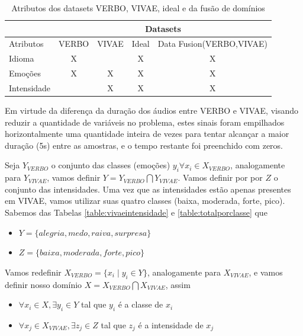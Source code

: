 \begin{table}[]
\centering
\caption{Atributos dos datasets VERBO, VIVAE, ideal e da fusão de domínios}
\begin{tabular}{l|cccc|}
\cline{2-5}
 & \multicolumn{4}{c|}{Datasets} \\ \hline
\multicolumn{1}{|l|}{Atributos} & \multicolumn{1}{c|}{VERBO} & \multicolumn{1}{c|}{VIVAE} & \multicolumn{1}{c|}{Ideal} & Data Fusion(VERBO,VIVAE) \\ \hline
\multicolumn{1}{|l|}{Idioma} & \multicolumn{1}{c|}{X} & \multicolumn{1}{c|}{} & \multicolumn{1}{c|}{X} & X \\ \hline
\multicolumn{1}{|l|}{Emoções} & \multicolumn{1}{c|}{X} & \multicolumn{1}{c|}{X} & \multicolumn{1}{c|}{X} & X \\ \hline
\multicolumn{1}{|l|}{Intensidade} & \multicolumn{1}{c|}{} & \multicolumn{1}{c|}{X} & \multicolumn{1}{c|}{X} & X \\ \hline
\end{tabular}\label{table:datasetideal}
\end{table}

Em virtude da diferença da duração dos áudios entre VERBO e VIVAE, visando reduzir a quantidade de variáveis no problema, estes sinais foram empilhados horizontalmente uma quantidade inteira de vezes para tentar alcançar a maior duração (5s) entre as amostras, e o tempo restante foi preenchido com zeros.

Seja $Y_{VERBO}$ o conjunto das classes (emoções) $y_i \forall x_i \in X_{VERBO}$, analogamente para $Y_{VIVAE}$, vamos definir $Y = Y_{VERBO} \bigcap Y_{VIVAE}$. Vamos definir por por $Z$ o conjunto das intensidades. Uma vez que as intensidades estão apenas presentes em VIVAE, vamos utilizar suas quatro classes (baixa, moderada, forte, pico). Sabemos das Tabelas \ref{table:vivaeintensidade} e \ref{table:totalporclasse} que

\begin{itemize}
    \item $Y = \{alegria, medo, raiva, surpresa\}$
    \item $Z = \{baixa, moderada, forte, pico\}$
\end{itemize}

Vamos redefinir $X_{VERBO} = \{x_i \mid y_i \in Y\}$, analogamente para $X_{VIVAE}$, e vamos definir nosso domínio $X = X_{VERBO} \bigcap X_{VIVAE}$, assim

\begin{itemize}
    \item $\forall x_i \in X, \exists y_i \in Y$ tal que  $y_i$ é a classe de $x_i$
    \item $\forall x_j \in X_{VIVAE}, \exists z_j \in Z$ tal que  $z_j$ é a intensidade de $x_j$
\end{itemize}

